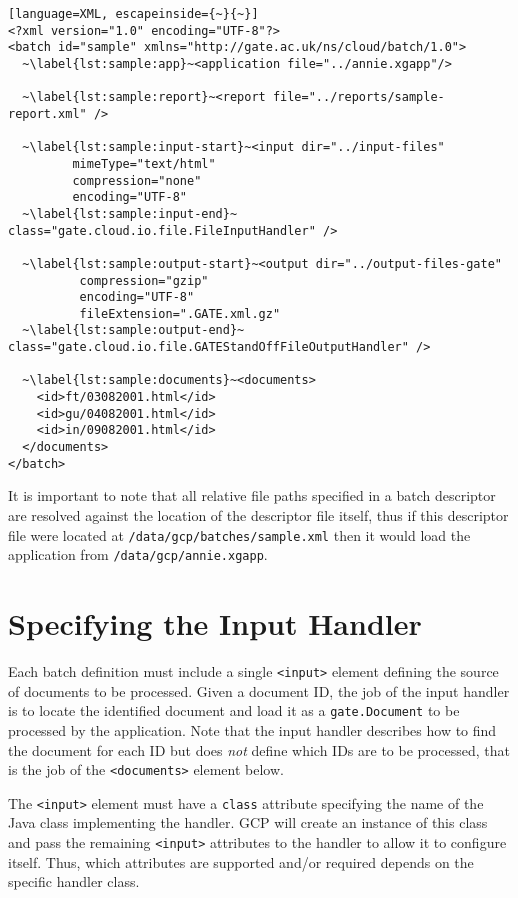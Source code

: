 \begin{lstlisting}[language=XML, escapeinside={~}{~}]
<?xml version="1.0" encoding="UTF-8"?>
<batch id="sample" xmlns="http://gate.ac.uk/ns/cloud/batch/1.0">
  ~\label{lst:sample:app}~<application file="../annie.xgapp"/>

  ~\label{lst:sample:report}~<report file="../reports/sample-report.xml" />

  ~\label{lst:sample:input-start}~<input dir="../input-files"
         mimeType="text/html"
         compression="none"
         encoding="UTF-8"
  ~\label{lst:sample:input-end}~       class="gate.cloud.io.file.FileInputHandler" />

  ~\label{lst:sample:output-start}~<output dir="../output-files-gate"
          compression="gzip"
          encoding="UTF-8"
          fileExtension=".GATE.xml.gz"
  ~\label{lst:sample:output-end}~        class="gate.cloud.io.file.GATEStandOffFileOutputHandler" />

  ~\label{lst:sample:documents}~<documents>
    <id>ft/03082001.html</id>
    <id>gu/04082001.html</id>
    <id>in/09082001.html</id>
  </documents>
</batch>
\end{lstlisting}

It is important to note that all relative file paths specified in a batch
descriptor are resolved against the location of the descriptor file itself,
thus if this descriptor file were located at
\verb!/data/gcp/batches/sample.xml! then it would load the application from
\verb!/data/gcp/annie.xgapp!.


\section{Specifying the Input Handler}

Each batch definition must include a single \verb!<input>! element defining the
source of documents to be processed.  Given a document ID, the job of the input
handler is to locate the identified document and load it as a
\verb!gate.Document! to be processed by the application.  Note that the input
handler describes how to find the document for each ID but does {\em not}
define which IDs are to be processed, that is the job of the \verb!<documents>!
element below.

The \verb!<input>!  element must have a \verb!class! attribute specifying the
name of the Java class implementing the handler.  GCP will create an instance
of this class and pass the remaining \verb!<input>! attributes to the handler
to allow it to configure itself.  Thus, which attributes are supported and/or
required depends on the specific handler class.

